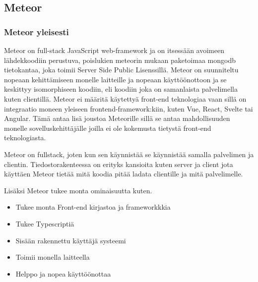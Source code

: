 \documentclass[11pt,a4paper,titlepage,oneside]{article}
\begin{document}
\newpage
\subsection{Meteor}                %



\subsubsection{Meteor yleisesti}








Meteor on full-stack JavaScript web-framework ja on itsessään avoimeen lähdekkoodiin perustuva, 
poislukien meteorin mukaan paketoimaa mongodb tietokantaa, joka toimii Server Side Public Lisenssillä.
Meteor on suunniteltu nopeaan kehittämiseen monelle laitteille ja nopeaan käyttöönottoon ja se keskittyy isomorphiseen koodiin, 
eli koodiin joka on samanlaista palvelimella kuten clientillä.\citemissing
Meteor ei määritä käytettyä front-end teknologiaa vaan sillä on integraatio moneen yleiseen frontend-framework:kiin, kuten Vue, React, Svelte tai Angular.
Tämä antaa lisä joustoa Meteorille sillä se antaa mahdollisuuden monelle sovelluskehittäjälle joilla ei ole kokemusta tietystä front-end teknologiasta.



\medskip

Meteor on fullstack, joten kun sen käynnistää se käynnistää samalla palvelimen ja clientin.
Tiedostorakenteessa on erityks kansioita kuten server ja client jota käyttäen Meteor tietää mitä koodia pitää ladata clientille ja mitä palvelimelle.




\medskip

    

Lisäksi Meteor tukee monta ominaisuutta kuten. 
\begin{itemize}
    \item Tukee monta Front-end kirjastoa ja frameworkkkia
    \item Tukee Typescriptiä
    \item Sisään rakennettu käyttäjä systeemi
    \item Toimii monella laitteella
    \item Helppo ja nopea käyttöönottaa 
\end{itemize}
\medskip
\end{document}
